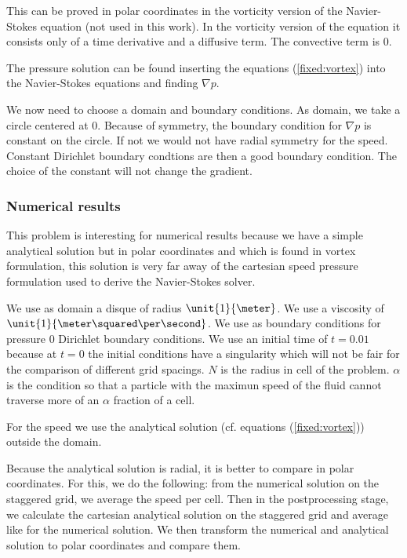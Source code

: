 This can be proved in polar coordinates in the vorticity version of the Navier-Stokes equation (not used in this work).
In the vorticity version of the equation it consists only of a time derivative and a diffusive term.
The convective term is 0.

The pressure solution can be found inserting the equations (\ref{fixed:vortex}) into the Navier-Stokes equations and finding $\nabla p$.

We now need to choose a domain and boundary conditions.
As domain, we take a circle centered at $0$. Because of symmetry, the boundary condition for $\nabla p$ is constant on the circle.
If not we would not have radial symmetry for the speed.
Constant Dirichlet boundary condtions are then a good boundary condition.
The choice of the constant will not change the gradient.

\subsubsection{Numerical results}

This problem is interesting for numerical results because we have a simple analytical solution but in polar coordinates and
which is found in vortex formulation, this solution is very far away of the cartesian speed pressure formulation used to
derive the Navier-Stokes solver.

We use as domain a disque of radius $\unit{1}{\meter}$. We use a viscosity of $\unit{1}{\meter \squared \per \second}$.
We use as boundary conditions for pressure $0$ Dirichlet boundary conditions.
We use an initial time of $t=0.01$ because at $t=0$ the initial conditions have a singularity which will not be fair for the 
comparison of different grid spacings.
$N$ is the radius in cell of the problem.
$\alpha$ is the condition so that a particle with the maximun speed of the fluid cannot traverse
more of an $\alpha$ fraction of a cell.

For the speed we use the analytical solution (cf. equations (\ref{fixed:vortex})) outside the domain.

Because the analytical solution is radial, it is better to compare in polar coordinates.
For this, we do the following:
from the numerical solution on the staggered grid,
we average the speed per cell. Then in the postprocessing stage, we calculate the cartesian analytical solution on the staggered grid and
average like for the numerical solution. We then transform the numerical and analytical solution to polar coordinates and compare them.

